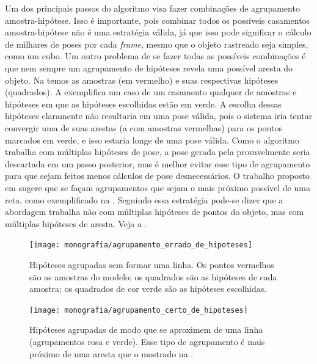 Um dos principais passos do algoritmo visa fazer combinações de agrupamento amostra-hipótese. Isso é importante, pois combinar todos os possíveis casamentos amostra-hipótese não é uma estratégia válida, já que isso pode significar o cálculo de milhares de poses por cada \emph{frame}, mesmo que o objeto rastreado seja simples, como um cubo. Um outro problema de se fazer todas as possíveis combinações é que nem sempre um agrupamento de hipóteses revela uma possível aresta do objeto. Na  temos as amostras (em vermelho) e suas respectivas hipóteses (quadrados). A  exemplifica um caso de um casamento qualquer de amostras e hipóteses em que as hipóteses escolhidas estão em verde. A escolha dessas hipóteses claramente não resultaria em uma pose válida, pois o sistema iria tentar convergir uma de suas arestas (a com amostras vermelhas) para os pontos marcados em verde, e isso estaria longe de uma pose válida. Como o algoritmo trabalha com múltiplas hipóteses de pose, a pose gerada pela  provavelmente seria descartada em um passo posterior, mas é melhor evitar esse tipo de agrupamento para que sejam feitos menos cálculos de pose desnecessários. O trabalho proposto em \cite{celine} sugere que se façam agrupamentos que sejam o mais próximo possível de uma reta, como exemplificado na . Seguindo essa estratégia pode-se dizer que a abordagem trabalha não com múltiplas hipóteses de pontos do objeto, mas com múltiplas hipóteses de aresta. Veja a .

\begin{figure}[!ht]
\centering\texttt{[image: monografia/agrupamento\_errado\_de\_hipoteses]}
\caption{Hipóteses agrupadas sem formar uma linha. Os pontos vermelhos são as amostras do modelo; os quadrados são as hipóteses de cada amostra; os quadrados de cor verde são as hipóteses escolhidas.}
\label{agrupamento_errado_de_hipoteses}
\end{figure}

\begin{figure}[!ht]
\centering\texttt{[image: monografia/agrupamento\_certo\_de\_hipoteses]}
\caption{Hipóteses agrupadas de modo que se aproximem de uma linha (agrupamentos rosa e verde). Esse tipo de agrupamento é mais próximo de uma aresta que o mostrado na .}
\label{agrupamento_certo_de_hipoteses}
\end{figure}

